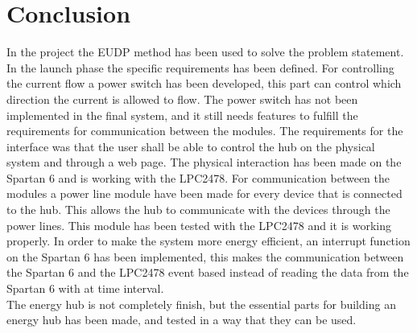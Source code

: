 \chapter{Conclusion}
In the project the EUDP method has been used to solve the problem statement. In the launch phase the specific requirements has been defined. For controlling the current flow a power switch has been developed, this part can control which direction the current is allowed to flow. The power switch has not been implemented in the final system, and it still needs features to fulfill the requirements for communication between the modules. The requirements for the interface was that the user shall be able to control the hub on the physical system and through a web page. The physical interaction has been made on the Spartan 6 and is working with the LPC2478. For communication between the modules a power line module have been made for every device that is connected to the hub. This allows the hub to communicate with the devices through the power lines. This module has been tested with the LPC2478 and it is working properly. In order to make the system more energy efficient, an interrupt function on the Spartan 6 has been implemented, this makes the communication between the Spartan 6 and the LPC2478 event based instead of reading the data from the Spartan 6 with at time interval.\\
The energy hub is not completely finish, but the essential parts for building an energy hub has been made, and tested in a way that they can be used.